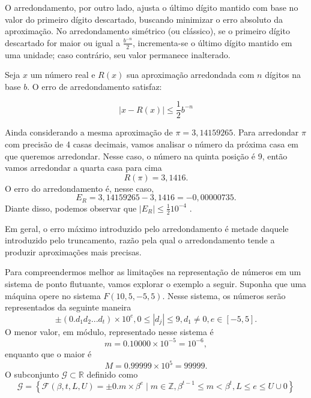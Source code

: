 O arredondamento, por outro lado, ajusta o último dígito mantido com base no valor do primeiro dígito descartado, buscando minimizar o erro absoluto da aproximação. No arredondamento simétrico (ou clássico), se o primeiro dígito descartado for maior ou igual a \( \frac{b^{-n}}{2} \), incrementa-se o último dígito mantido em uma unidade; caso contrário, seu valor permanece inalterado.

Seja \( x \) um número real e \( R(x) \) sua aproximação arredondada com \( n \) dígitos na base \( b \). O erro de arredondamento satisfaz:

\[
|x - R(x)| \leq \frac{1}{2} b^{-n}
\]

\begin{ex}
Ainda considerando a mesma aproximação de \(\pi = 3,14159265\).
Para arredondar $\pi$  com precisão de 4 casas decimais, vamos analisar o número da próxima casa em que queremos arredondar. Nesse caso, o número na quinta posição é 9, então vamos arredondar a quarta casa para cima 
$$R(\pi) = 3,1416.$$
O erro do arredondamento é, nesse caso, $$E_R = 3,14159265 - 3,1416  = -0,00000735.$$  
Diante disso, podemos observar que $|E_R| \leq  \frac{ 1}{2}10^{-4}$ . %
\end{ex}

Em geral, o erro máximo introduzido pelo arredondamento é metade daquele introduzido pelo truncamento, razão pela qual o arredondamento tende a produzir aproximações mais precisas.




Para compreendermos melhor as limitações na representação de números em um sistema de ponto flutuante, vamos explorar o exemplo a seguir. Suponha que uma máquina opere no sistema $F(10, 5, -5, 5)$. %
Nesse sistema, os números serão representados da seguinte maneira
\begin{equation}
\pm (0.d_{1}d_{2} . . . d_{t}) \times 10^e,  0 \leq |d_{j}| \leq 9,  d_{1} \neq 0, e \in [-5,5].
\end{equation}
O menor valor, em módulo, representado nesse sistema é
$$
m = 0.10000 \times 10^{-5} = 10^{-6},
$$
enquanto que o maior é
$$
M = 0.99999 \times 10^{5} = 99999.
$$
O subconjunto $\mathcal{G} \subset \mathbb{R}$ definido como
\[
\mathcal{G} = \left\{ \mathcal{F}(\beta,t,L,U)={\pm 0.m \times \beta^e \mid m \in \mathbb{Z}, \beta^{t-1} \le m < \beta^t, L \leq e \leq U}\cup{0} \right\}
\]

